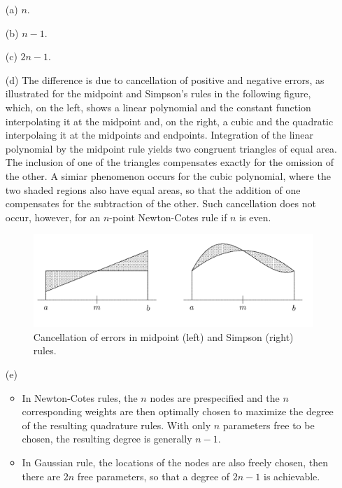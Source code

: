 \begin{sol}
  \begin{itemize}
  \item[(a)]
    $n$.

  \item[(b)]
    $n-1$.

  \item[(c)]
    $2n-1$.

  \item[(d)]
    The difference is due to cancellation of positive and negative errors,
    as illustrated for the midpoint and Simpson's rules in the following figure,
    which, on the left, shows a linear polynomial and
    the constant function interpolating it at the midpoint and,
    on the right, a cubic and the quadratic interpolaing it at the midpoints
    and endpoints.
    Integration of the linear polynomial by the midpoint rule yields
    two congruent triangles of equal area.
    The inclusion of one of the triangles compensates exactly for the
    omission of the other.
    A simiar phenomenon occurs for the cubic polynomial,
    where the two shaded regions also have equal areas,
    so that the addition of one compensates for the subtraction of the other.
    Such cancellation does not occur,
    however,
    for an $n$-point Newton-Cotes rule if $n$ is even.
    \begin{figure}[H]
      \centering
      \includegraphics[scale=0.25]{Newton-Cotes.png}
      \caption{Cancellation of errors in midpoint (left) and Simpson (right) rules.}
    \end{figure}

  \item[(e)]
    \begin{itemize}
      \item
    In Newton-Cotes rules,
    the $n$ nodes are prespecified and the $n$ corresponding weights
    are then optimally chosen to maximize the degree of the
    resulting quadrature rules.
    With only $n$ parameters free to be chosen,
    the resulting degree is generally $n-1$.
  \item
    In Gaussian rule,
    the locations of the nodes are also freely chosen,
    then there are $2n$ free parameters,
    so that a degree of $2n-1$ is achievable.
  \end{itemize}
\end{itemize}
\end{sol}
